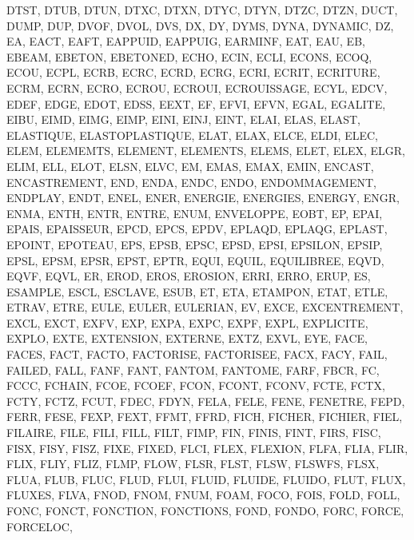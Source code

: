 {{{		DTST,
		DTUB,
		DTUN,
		DTXC,
		DTXN,
		DTYC,
		DTYN,
		DTZC,
		DTZN,
		DUCT,
		DUMP,
		DUP,
		DVOF,
		DVOL,
		DVS,
		DX,
		DY,
		DYMS,
		DYNA,
		DYNAMIC,
		DZ,
		EA,
		EACT,
		EAFT,
		EAPPUID,
		EAPPUIG,
		EARMINF,
		EAT,
		EAU,
		EB,
		EBEAM,
		EBETON,
		EBETONED,
		ECHO,
		ECIN,
		ECLI,
		ECONS,
		ECOQ,
		ECOU,
		ECPL,
		ECRB,
		ECRC,
		ECRD,
		ECRG,
		ECRI,
		ECRIT,
		ECRITURE,
		ECRM,
		ECRN,
		ECRO,
		ECROU,
		ECROUI,
		ECROUISSAGE,
		ECYL,
		EDCV,
		EDEF,
		EDGE,
		EDOT,
		EDSS,
		EEXT,
		EF,
		EFVI,
		EFVN,
		EGAL,
		EGALITE,
		EIBU,
		EIMD,
		EIMG,
		EIMP,
		EINI,
		EINJ,
		EINT,
		ELAI,
		ELAS,
		ELAST,
		ELASTIQUE,
		ELASTOPLASTIQUE,
		ELAT,
		ELAX,
		ELCE,
		ELDI,
		ELEC,
		ELEM,
		ELEMEMTS,
		ELEMENT,
		ELEMENTS,
		ELEMS,
		ELET,
		ELEX,
		ELGR,
		ELIM,
		ELL,
		ELOT,
		ELSN,
		ELVC,
		EM,
		EMAS,
		EMAX,
		EMIN,
		ENCAST,
		ENCASTREMENT,
		END,
		ENDA,
		ENDC,
		ENDO,
		ENDOMMAGEMENT,
		ENDPLAY,
		ENDT,
		ENEL,
		ENER,
		ENERGIE,
		ENERGIES,
		ENERGY,
		ENGR,
		ENMA,
		ENTH,
		ENTR,
		ENTRE,
		ENUM,
		ENVELOPPE,
		EOBT,
		EP,
		EPAI,
		EPAIS,
		EPAISSEUR,
		EPCD,
		EPCS,
		EPDV,
		EPLAQD,
		EPLAQG,
		EPLAST,
		EPOINT,
		EPOTEAU,
		EPS,
		EPSB,
		EPSC,
		EPSD,
		EPSI,
		EPSILON,
		EPSIP,
		EPSL,
		EPSM,
		EPSR,
		EPST,
		EPTR,
		EQUI,
		EQUIL,
		EQUILIBREE,
		EQVD,
		EQVF,
		EQVL,
		ER,
		EROD,
		EROS,
		EROSION,
		ERRI,
		ERRO,
		ERUP,
		ES,
		ESAMPLE,
		ESCL,
		ESCLAVE,
		ESUB,
		ET,
		ETA,
		ETAMPON,
		ETAT,
		ETLE,
		ETRAV,
		ETRE,
		EULE,
		EULER,
		EULERIAN,
		EV,
		EXCE,
		EXCENTREMENT,
		EXCL,
		EXCT,
		EXFV,
		EXP,
		EXPA,
		EXPC,
		EXPF,
		EXPL,
		EXPLICITE,
		EXPLO,
		EXTE,
		EXTENSION,
		EXTERNE,
		EXTZ,
		EXVL,
		EYE,
		FACE,
		FACES,
		FACT,
		FACTO,
		FACTORISE,
		FACTORISEE,
		FACX,
		FACY,
		FAIL,
		FAILED,
		FALL,
		FANF,
		FANT,
		FANTOM,
		FANTOME,
		FARF,
		FBCR,
		FC,
		FCCC,
		FCHAIN,
		FCOE,
		FCOEF,
		FCON,
		FCONT,
		FCONV,
		FCTE,
		FCTX,
		FCTY,
		FCTZ,
		FCUT,
		FDEC,
		FDYN,
		FELA,
		FELE,
		FENE,
		FENETRE,
		FEPD,
		FERR,
		FESE,
		FEXP,
		FEXT,
		FFMT,
		FFRD,
		FICH,
		FICHER,
		FICHIER,
		FIEL,
		FILAIRE,
		FILE,
		FILI,
		FILL,
		FILT,
		FIMP,
		FIN,
		FINIS,
		FINT,
		FIRS,
		FISC,
		FISX,
		FISY,
		FISZ,
		FIXE,
		FIXED,
		FLCI,
		FLEX,
		FLEXION,
		FLFA,
		FLIA,
		FLIR,
		FLIX,
		FLIY,
		FLIZ,
		FLMP,
		FLOW,
		FLSR,
		FLST,
		FLSW,
		FLSWFS,
		FLSX,
		FLUA,
		FLUB,
		FLUC,
		FLUD,
		FLUI,
		FLUID,
		FLUIDE,
		FLUIDO,
		FLUT,
		FLUX,
		FLUXES,
		FLVA,
		FNOD,
		FNOM,
		FNUM,
		FOAM,
		FOCO,
		FOIS,
		FOLD,
		FOLL,
		FONC,
		FONCT,
		FONCTION,
		FONCTIONS,
		FOND,
		FONDO,
		FORC,
		FORCE,
		FORCELOC,
}}}
